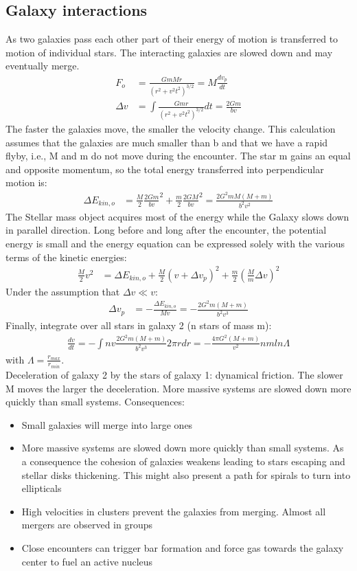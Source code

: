 \documentclass[11pt,a4paper]{article}
\begin{document}
\subsection{Galaxy interactions}
As two galaxies pass each other part of their energy of motion is transferred to motion of individual stars.
The interacting galaxies are slowed down and may eventually merge.
\begin{align*}
    F_o &= \frac {GmMr}{(r^2+v^2 t^2)^{3/2}} = M \frac{dv_p}{dt}  \\
    \Delta v &= \int \frac {Gmr}{(r^2+v^2 t^2)^{3/2}} dt = \frac {2Gm}{bv}
\end{align*}
The faster the galaxies move, the smaller the velocity change.
This calculation assumes that the galaxies are much smaller than b and that we have a rapid flyby, i.e., M and m do not move during the encounter.
The star m gains an equal and opposite momentum, so the total energy transferred into perpendicular motion is:
\begin{align*}
    \Delta E_{kin,o} &= \frac M 2 \frac {2Gm}{bv}^2 + \frac m 2 \frac {2GM}{bv}^2 = \frac {2G^2m M(M+m)}{b^2v^2}
\end{align*}
The Stellar mass object acquires most of the energy while the Galaxy slows down in parallel direction.
Long before and long after the encounter, the potential energy is small and the energy equation can be expressed solely with the various terms of the kinetic energies:
\begin{align*}
\frac M 2 v^2 &= \Delta E_{kin,o} + \frac M 2 (v + \Delta v_p)^2 + \frac m 2 (\frac M m \Delta v)^2
\end{align*}
Under the assumption that $\Delta v \ll v$:
\begin{align*}
    \Delta v_p &= - \frac {\Delta E_{kin,o}}{Mv} = - \frac {2G^2m(M+m)}{b^2 v^3}
\end{align*}
Finally, integrate over all stars in galaxy 2 (n stars of mass m):
\begin{align*}
    \frac {dv}{dt} = - \int nv \frac  {2G^2m(M+m)}{b^2 v^3} 2 \pi rdr  = - \frac {4\pi G^2(M+m)}{v^2} nm ln \Lambda
\end{align*}
with $\Lambda = \frac {r_{max}}{r_{min}}$. \\
Deceleration of galaxy 2 by the stars of galaxy 1: dynamical friction.
The slower M moves the larger the deceleration.
More massive systems are slowed down more quickly than small systems.
Consequences:
\begin{itemize}
    \item Small galaxies will merge into large ones 
    \item More massive systems are slowed down more quickly than small systems. As a consequence the cohesion of galaxies weakens leading to stars escaping and stellar disks thickening. This might also present a path for spirals to turn into ellipticals
    \item High velocities in clusters prevent the galaxies from merging. Almost all
mergers are observed in groups
\item Close encounters can trigger bar formation and force gas towards the galaxy
center to fuel an active nucleus
\end{itemize}
\end{document}
